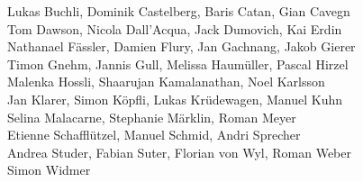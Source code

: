 %
%
%
Lukas Buchli,		%
Dominik Castelberg,	%
Baris Catan,		%
Gian Cavegn%
\\
Tom Dawson,		%
Nicola Dall'Acqua,	%
Jack Dumovich,	%
Kai Erdin%
\\
Nathanael Fässler,	%
Damien Flury,		%
Jan Gachnang,		%
Jakob Gierer%
\\
Timon Gnehm,		%
Jannis Gull,		%
Melissa Haumüller,	%
Pascal Hirzel%
\\
Malenka Hossli,		%
Shaarujan Kamalanathan,	%
Noel Karlsson%
\\
Jan Klarer,		%
Simon Köpfli,		%
Lukas Krüdewagen,	%
Manuel Kuhn%
\\
Selina Malacarne,	%
Stephanie Märklin,	%
Roman Meyer%
\\
Etienne Schafflützel,	%
Manuel Schmid,		%
Andri Sprecher%
\\
Andrea Studer,		%
Fabian Suter,		%
Florian von Wyl,	%
Roman Weber%
\\
Simon Widmer%
